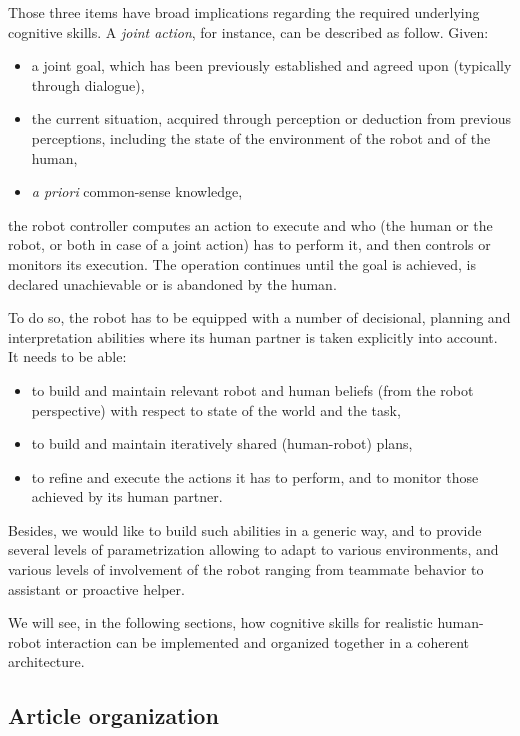 \documentclass[preprint,3p,times]{elsarticle}
\begin{document}
Those three items have broad implications regarding the required underlying
cognitive skills.  A \emph{joint action}, for instance, can be described as
follow. Given:

\begin {itemize}
\item a joint goal, which has been previously established and agreed
  upon (typically through dialogue),
\item the current situation, acquired through perception or
  deduction from previous perceptions, including the state of the
  environment of the robot and of the human,
\item {\it a priori} common-sense knowledge,
\end {itemize}

the robot controller computes an action to execute and who (the 
human or the robot, or both in case of a joint action) has to perform
it, and then controls or monitors its execution. The operation
continues until the goal is achieved, is declared unachievable or is
abandoned by the human.

To do so, the robot has to be equipped with a number of decisional, planning
and interpretation abilities where its human partner is taken explicitly into
account. It needs to be able:

\begin{itemize}
\item to build and maintain relevant robot and human beliefs
  (from the robot perspective) with respect to state of the world and the task,
\item to build and maintain iteratively shared (human-robot) plans, 
\item to refine and execute the actions it has to perform, and to monitor 
those achieved by its human partner.
\end{itemize}

Besides, we would like to build such abilities in a generic way, and
to provide several levels of parametrization allowing to adapt to
various environments, and various levels of involvement of the robot
ranging from teammate behavior to assistant or proactive helper.

We will see, in the following sections, how cognitive skills for realistic
human-robot interaction can be implemented and organized together in a coherent
architecture.

\subsection{Article organization}
\end{document}
